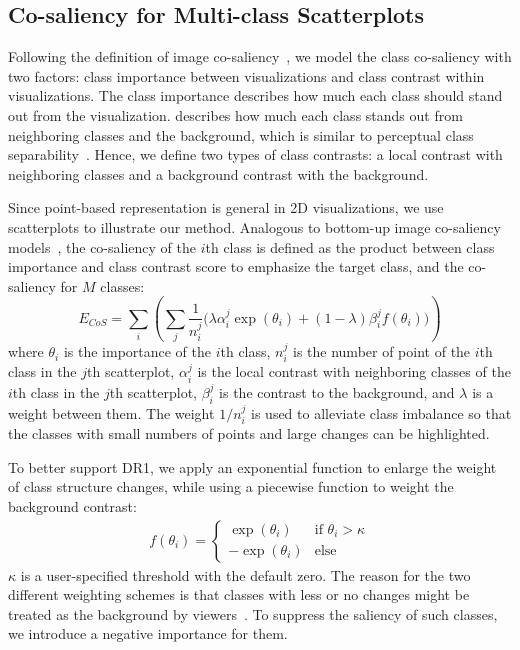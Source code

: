 \subsection{Co-saliency for Multi-class Scatterplots }
Following the definition of image co-saliency~\cite{Jacobs10}, we model the class co-saliency with two factors: class importance between visualizations and class contrast within visualizations. The class importance describes how much each class should stand out from the visualization.
describes how much each class stands out from neighboring classes and the background,
which is similar to perceptual class separability~\cite{Aupetit02,Wang2018}. Hence,
we define two types of class contrasts: a local contrast with neighboring classes and a background contrast with the background.

Since point-based representation is general in 2D visualizations, we use scatterplots to illustrate our method.
Analogous to bottom-up image co-saliency models~\cite{Jacobs10,Fu13}, the co-saliency of the $i$th class is defined as the product between class importance and  class contrast score to emphasize the target class, and the co-saliency for $M$ classes:
\begin{equation}
E_{CoS} = \sum_i    \left(\sum_j \frac{1}{n^j_i}\bigg(\lambda \alpha^j_i\exp(\theta_i) + (1-\lambda) \beta^j_i f(\theta_i) \bigg) \right)
	\label{eq:cosaliency}
\end{equation}
where $\theta_i$ is the importance of the $i$th class,
$n^j_i$ is the number of point of the $i$th class in the $j$th scatterplot,
$\alpha^j_i$ is the local contrast with neighboring classes of the $i$th class in the $j$th scatterplot, $\beta^j_i$  is the contrast to the background, and $\lambda$ is a weight between them. The weight $1/{n^j_i}$  is used to alleviate class imbalance  so that the classes with small numbers of points and large changes can be highlighted.

To better support DR1, we apply an exponential function to enlarge the weight of class structure changes, while using a piecewise function to weight the background contrast:
\begin{align}
f(\theta_i) =  \left\{ \begin{array}{ll}
\exp(\theta_i) & \textrm{if $\theta_i>\kappa$}\\
-\exp(\theta_i) & \textrm{else}
\end{array} \right.
\label{eq:energyfunc}
\end{align}
$\kappa$ is a user-specified threshold with the default zero. The reason for the two different weighting schemes is that classes with less or no changes might be treated as the background by viewers~\cite{zhang2018review}. To suppress the saliency of such classes, we introduce a negative importance for them.


